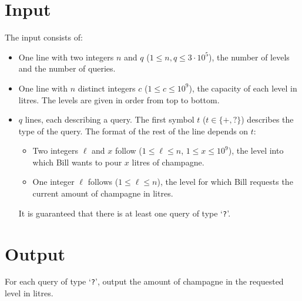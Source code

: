 \section*{Input}
The input consists of:
\begin{itemize}
    \item One line with two integers $n$ and $q$ ($1\leq n, q \leq 3 \cdot 10^5$), the number of levels and the number of queries.
    \item One line with $n$ distinct integers $c$ ($1\leq c \leq 10^9$), the capacity of each level in litres.
    The levels are given in order from top to bottom.
    \item $q$ lines, each describing a query.
    The first symbol $t$ ($t \in \{ \mathtt{+}, \mathtt{?} \}$) describes the type of the query.
    The format of the rest of the line depends on $t$:
    \setlength\leftmarginii{1.95cm}
    \begin{itemize}
	    \item[$t=\text{`\texttt{+}'}$:] Two integers $\ell$ and $x$ follow ($1 \leq \ell \leq n$, $1 \leq x \leq 10^9$), the level into which Bill wants to pour $x$ litres of champagne.
	    \item[$t=\text{`\texttt{?}'}$:] One integer $\ell$ follows ($1 \leq \ell \leq n$), the level for which Bill requests the current amount of champagne in litres.
    \end{itemize}
    It is guaranteed that there is at least one query of type `\texttt{?}'.
\end{itemize}

\section*{Output}
For each query of type `\texttt{?}', output the amount of champagne in the requested level in litres.
